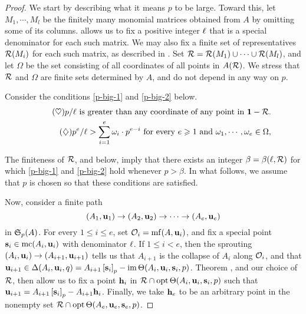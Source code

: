 \documentclass[11pt]{amsart}
\begin{document}
\begin{proof}  We start by describing what it means $p$ to be large.  Toward this, let $M_1, \cdots, M_l$ be the finitely many monomial matrices obtained from $A$ by omitting some of its columns.   allows us to fix a positive integer $\ell$ that is a special denominator for each such matrix.  We may also fix a finite set of representatives $\mathcal{R}(M_i)$ for each such matrix, as described in .  Set $\mathcal{R} = \mathcal{R}(M_1) \cup \cdots \cup \mathcal{R}(M_l)$, and let $\Omega$ be the set consisting of all coordinates of all points in $A(\mathcal{R})$.  We stress that $\mathcal{R}$ and $\Omega$ are finite sets determined by $A$, and do not depend in any way on $p$.  

Consider the conditions \eqref{p-big-1} and \eqref{p-big-2} below.  
%
\begin{align}
\tag{$\heartsuit$} \label{p-big-1}
\text{$p/\ell$ is greater than any coordinate of any point in $\mathbf{1} - \mathcal{R}$.} \\ 
 \label{p-big-2}
\tag{$\diamondsuit$}\text{$p^e / \ell > \sum_{i=1}^e \omega_i \cdot p^{e-i}$ for every $e \geqslant 1$ and $\omega_1, \cdots, \omega_e \in \Omega$,}
\end{align}

The finiteness of $\mathcal{R}$,  and  below, imply that there exists an integer $\beta = \beta(\ell, \mathcal{R})$ for which \eqref{p-big-1} and \eqref{p-big-2} hold whenever $p > \beta$.  In what follows, we assume that $p$ is chosen so that these conditions are satisfied.

Now, consider a finite path \[ (A_1, \mathbf{u}_1) \to (A_2, \mathbf{u}_2) \to \cdots \to (A_e, \mathbf{u}_e) \] in $\mathfrak{S}_p(A)$.  For every $1 \leq i \leq e$, set $\mathcal{O}_i = \operatorname{mf}(A, \mathbf{u}_i)$, and fix a special point $\mathbf{s}_i \in \operatorname{mc}(A_i, \mathbf{u}_i)$ with denominator $\ell$.  If $1 \leq i < e$, then the sprouting $(A_i, \mathbf{u}_i) \to (A_{i+1}, \mathbf{u}_{i+1})$ tells us that $A_{i+1}$ is the collapse of $A_i$ along $\mathcal{O}_i$, and that $\mathbf{u}_{i+1} \in \Delta(A_i, \mathbf{u}_i, q) = A_{i+1} \left[ \mathbf{s}_i \right]_p - \operatorname{im}  \Theta( A_i, \mathbf{u}_i, \mathbf{s}_i, p)$.  Theorem , and our choice of $\mathcal{R}$, then allow us to fix a point $\mathbf{h}_i$ in $\mathcal{R} \cap \operatorname{opt} \Theta ( A_i, \mathbf{u}_i, \mathbf{s}_i, p)$ such that 
$\mathbf{u}_{i+1} = A_{i+1} \left[ \mathbf{s}_i \right]_p - A_{i+1} \mathbf{h}_i$.  Finally, we take $\mathbf{h}_e$ to be an arbitrary point in the nonempty set $\mathcal{R} \cap \operatorname{opt} \Theta ( A_e, \mathbf{u}_e, \mathbf{s}_e, p)$.



\end{proof}
\end{document}
